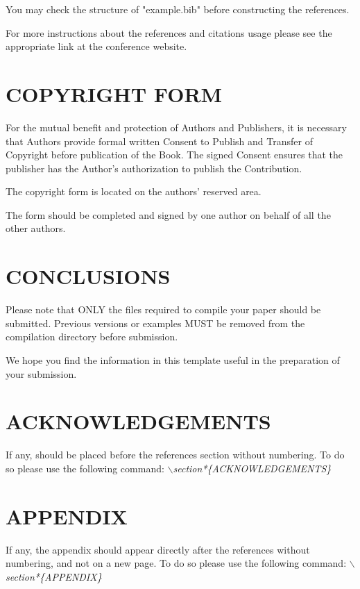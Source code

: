 \documentclass[a4paper,twoside]{article}
\begin{document}
You may check the structure of "example.bib" before constructing the
references.

For more instructions about the references and citations usage
please see the appropriate link at the conference website.

\section{\uppercase{Copyright Form}}

\noindent For the mutual benefit and protection of Authors and
Publishers, it is necessary that Authors provide formal written
Consent to Publish and Transfer of Copyright before publication of
the Book. The signed Consent ensures that the publisher has the
Author's authorization to publish the Contribution.

The copyright form is located on the authors' reserved area.

The form should be completed and signed by one author on
behalf of all the other authors.

\section{\uppercase{Conclusions}}
\label{sec:conclusion}

\noindent Please note that ONLY the files required to compile your paper should be submitted. Previous versions or examples MUST be removed from the compilation directory before submission.

We hope you find the information in this template useful in the preparation of your submission.

\section*{\uppercase{Acknowledgements}}

\noindent If any, should be placed before the references section
without numbering. To do so please use the following command:
\textit{$\backslash$section*\{ACKNOWLEDGEMENTS\}}


\vfill

{\small
}


\section*{\uppercase{Appendix}}

\noindent If any, the appendix should appear directly after the
references without numbering, and not on a new page. To do so please use the following command:
\textit{$\backslash$section*\{APPENDIX\}}

\vfill
\end{document}
